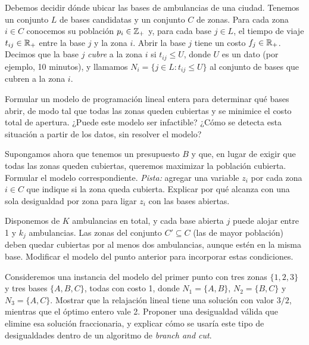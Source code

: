 \documentclass[11pt,a4paper]{article}
\begin{document}
\newpage
Debemos decidir dónde ubicar las bases de ambulancias de una ciudad. Tenemos un
conjunto $L$ de bases candidatas y un conjunto $C$ de zonas. Para cada zona
$i \in C$ conocemos su población $p_i \in \mathbb{Z}_+$ y, para cada base $j \in L$, el
tiempo de viaje $t_{ij} \in \mathbb{R}_+$ entre la base $j$ y la zona $i$. Abrir la base
$j$ tiene un costo $f_j \in \mathbb{R}_+$. Decimos que la base $j$ \emph{cubre} a la zona
$i$ si $t_{ij} \le U$, donde $U$ es un dato (por ejemplo, 10 minutos), y
llamamos $N_i = \{ j \in L : t_{ij} \le U \}$ al conjunto de bases que cubren a
la zona $i$.

\begin{puntos}
  \item Formular un modelo de programación lineal entera para determinar qué
  bases abrir, de modo tal que todas las zonas queden cubiertas y se minimice el
  costo total de apertura. ¿Puede este modelo ser infactible? ¿Cómo se detecta
  esta situación a partir de los datos, sin resolver el modelo?

  \item Supongamos ahora que tenemos un presupuesto $B$ y que, en lugar de
  exigir que todas las zonas queden cubiertas, queremos maximizar la población
  cubierta. Formular el modelo correspondiente. \emph{Pista:} agregar una
  variable $z_i$ por cada zona $i \in C$ que indique si la zona queda cubierta.
  Explicar por qué alcanza con una sola desigualdad por zona para ligar $z_i$
  con las bases abiertas.

  \item Disponemos de $K$ ambulancias en total, y cada base abierta $j$ puede
  alojar entre 1 y $k_j$ ambulancias. Las zonas del conjunto $C' \subseteq C$
  (las de mayor población) deben quedar cubiertas por al menos dos ambulancias,
  aunque estén en la misma base. Modificar el modelo del punto anterior para
  incorporar estas condiciones.

  \item Consideremos una instancia del modelo del primer punto con tres zonas
  $\{1,2,3\}$ y tres bases $\{A,B,C\}$, todas con costo 1, donde
  $N_1 = \{A, B\}$, $N_2 = \{B, C\}$ y $N_3 = \{A, C\}$. Mostrar que la
  relajación lineal tiene una solución con valor $3/2$, mientras que el óptimo
  entero vale 2. Proponer una desigualdad válida que elimine esa solución
  fraccionaria, y explicar cómo se usaría este tipo de desigualdades dentro de un
  algoritmo de \emph{branch and cut}.
\end{puntos}
\end{document}
